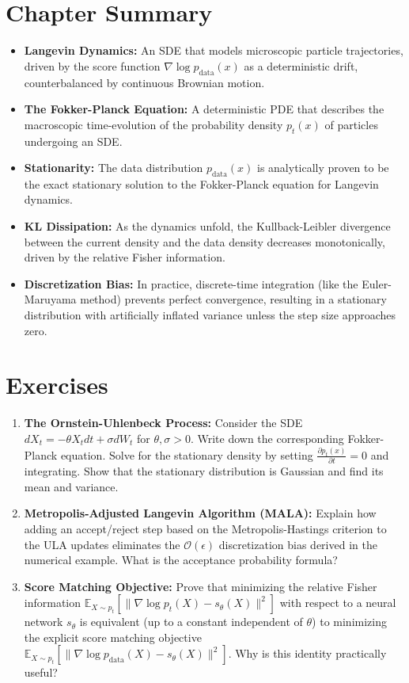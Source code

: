 \section*{Chapter Summary}
\begin{itemize}
    \item \textbf{Langevin Dynamics:} An SDE that models microscopic particle trajectories, driven by the score function $\nabla \log p_{\text{data}}(x)$ as a deterministic drift, counterbalanced by continuous Brownian motion.
    \item \textbf{The Fokker-Planck Equation:} A deterministic PDE that describes the macroscopic time-evolution of the probability density $p_t(x)$ of particles undergoing an SDE.
    \item \textbf{Stationarity:} The data distribution $p_{\text{data}}(x)$ is analytically proven to be the exact stationary solution to the Fokker-Planck equation for Langevin dynamics.
    \item \textbf{KL Dissipation:} As the dynamics unfold, the Kullback-Leibler divergence between the current density and the data density decreases monotonically, driven by the relative Fisher information.
    \item \textbf{Discretization Bias:} In practice, discrete-time integration (like the Euler-Maruyama method) prevents perfect convergence, resulting in a stationary distribution with artificially inflated variance unless the step size approaches zero.
\end{itemize}

\section*{Exercises}
\begin{enumerate}
    \item \textbf{The Ornstein-Uhlenbeck Process:} Consider the SDE $dX_t = -\theta X_t dt + \sigma dW_t$ for $\theta, \sigma > 0$. Write down the corresponding Fokker-Planck equation. Solve for the stationary density by setting $\frac{\partial p_t(x)}{\partial t} = 0$ and integrating. Show that the stationary distribution is Gaussian and find its mean and variance.
    \item \textbf{Metropolis-Adjusted Langevin Algorithm (MALA):} Explain how adding an accept/reject step based on the Metropolis-Hastings criterion to the ULA updates eliminates the $\mathcal{O}(\epsilon)$ discretization bias derived in the numerical example. What is the acceptance probability formula?
    \item \textbf{Score Matching Objective:} Prove that minimizing the relative Fisher information $\mathbb{E}_{X \sim p_t}[\| \nabla \log p_t(X) - s_\theta(X) \|^2]$ with respect to a neural network $s_\theta$ is equivalent (up to a constant independent of $\theta$) to minimizing the explicit score matching objective $\mathbb{E}_{X \sim p_t}[\| \nabla \log p_{\text{data}}(X) - s_\theta(X) \|^2]$. Why is this identity practically useful?
\end{enumerate}

